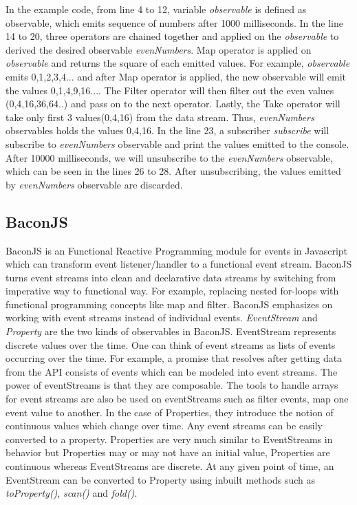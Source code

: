 In the example code, from line 4 to 12, variable \textit{observable} is defined as observable, which emits sequence of numbers after 1000 milliseconds. In the line 14 to 20, three operators are chained together and applied on the \textit{observable} to derived the desired observable \textit{evenNumbers}. Map operator is applied on \textit{observable} and returns the square of each emitted values. For example, \textit{observable} emits 0,1,2,3,4... and after Map operator is applied, the new observable will emit the values 0,1,4,9,16.... The Filter operator will then filter out the even values (0,4,16,36,64..) and pass on to the next operator. Lastly, the Take operator will take only first 3 values(0,4,16) from the data stream. Thus, \textit{evenNumbers} observables holds the values 0,4,16. In the line 23, a subscriber \textit{subscribe} will subscribe to \textit{evenNumbers} observable and print the values emitted to the console. After 10000 milliseconds, we will unsubscribe to the \textit{evenNumbers} observable, which can be seen in the lines 26 to 28. After unsubscribing, the values emitted by \textit{evenNumbers} observable are discarded.


\subsection{BaconJS}
BaconJS is an Functional Reactive Programming module for events in Javascript which can transform event listener/handler to a functional event stream. BaconJS turns event streams into clean and declarative data streams by switching from imperative way to functional way. For example, replacing nested for-loops with functional programming concepts like map and filter. BaconJS emphasizes on working with event streams instead of individual events. \textit{EventStream} and \textit{Property} are the two kinds of observables in BaconJS. EventStream represents discrete values over the time. One can think of event streams as lists of events occurring over the time. For example, a promise that resolves after getting data from the API consists of events which can be modeled into event streams. The power of eventStreams is that they are composable. The tools to handle arrays for event streams are also be used on eventStreams such as filter events, map one event value to another. In the case of Properties, they introduce the notion of continuous values which change over time. Any event streams can be easily converted to a property.  Properties are very much similar to EventStreams in behavior but Properties may or may not have an initial value, Properties are continuous whereas EventStreams are discrete. At any given point of time, an EventStream can be converted to Property using inbuilt methods such as \textit{toProperty()}, \textit{scan()} and \textit{fold()}\cite{baconBlog}. 



